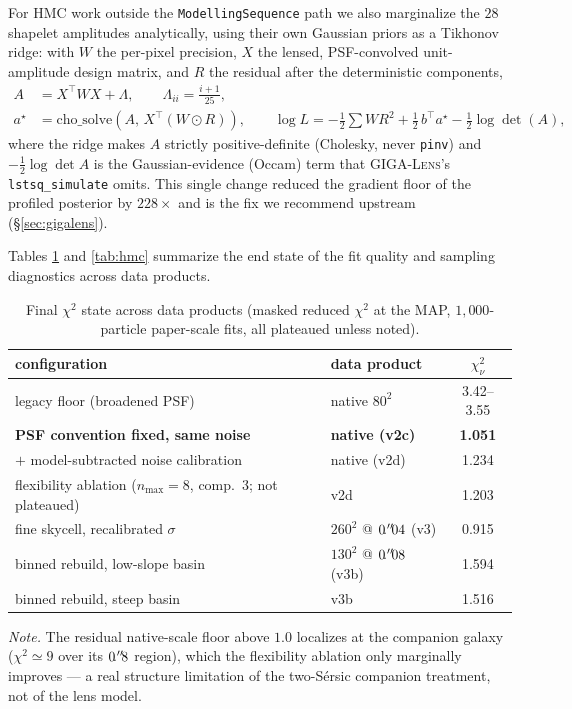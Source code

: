 \documentclass[11pt,letterpaper]{article}
\newcommand{\gigalens}{\textsc{GIGA-Lens}}
\begin{document}
For HMC work outside the \texttt{ModellingSequence} path we also
marginalize the $28$ shapelet amplitudes analytically, using their own
Gaussian priors as a Tikhonov ridge: with $W$ the per-pixel precision,
$X$ the lensed, PSF-convolved unit-amplitude design matrix, and $R$ the
residual after the deterministic components,
\begin{align*}
  A &= X^{\!\top} W X + \Lambda, \qquad
       \Lambda_{ii} = \frac{i+1}{25},\\
  a^{\star} &= \mathrm{cho\_solve}(A,\,X^{\!\top}(W\!\odot R)),\qquad
  \log L = -\tfrac12\!\sum W R^{2}
            + \tfrac12\, b^{\!\top} a^{\star}
            - \tfrac12 \log\det(A),
\end{align*}
where the ridge makes $A$ strictly positive-definite (Cholesky, never
\texttt{pinv}) and $-\tfrac12\log\det A$ is the Gaussian-evidence
(Occam) term that \gigalens's \texttt{lstsq\_simulate} omits. This
single change reduced the gradient floor of the profiled posterior by
$228\times$ and is the fix we recommend upstream
(\S\ref{sec:gigalens}).

Tables \ref{tab:ladder} and \ref{tab:hmc} summarize the end state of
the fit quality and sampling diagnostics across data products.

\begin{table}[ht]
\centering
\caption{Final $\chi^{2}$ state across data products (masked reduced
$\chi^{2}$ at the MAP, $1{,}000$-particle paper-scale fits, all
plateaued unless noted).}
\label{tab:ladder}
\begin{tabular}{llc}
\toprule
configuration & data product & $\chi^{2}_{\nu}$ \\
\midrule
legacy floor (broadened PSF) & native $80^2$ & 3.42--3.55 \\
{\bf PSF convention fixed, same noise} & {\bf native (v2c)} & {\bf 1.051} \\
$+$ model-subtracted noise calibration & native (v2d) & 1.234 \\
flexibility ablation ($n_{\max}{=}8$, comp.~3; not plateaued) & v2d & 1.203 \\
fine skycell, recalibrated $\sigma$ & $260^2$ @ $0\mbox{$\!\!\,.{}^{\prime\prime}\!\!\,$}04$ (v3) & 0.915 \\
binned rebuild, low-slope basin & $130^2$ @ $0\mbox{$\!\!\,.{}^{\prime\prime}\!\!\,$}08$ (v3b) & 1.594 \\
binned rebuild, steep basin & v3b & 1.516 \\
\bottomrule
\end{tabular}
\par\smallskip
{\footnotesize\textit{Note.} The residual native-scale floor above
$1.0$ localizes at the companion galaxy ($\chi^{2}\simeq9$ over its
$0\mbox{$\!\!\,.{}^{\prime\prime}\!\!\,$}8$ region), which the flexibility ablation only marginally
improves --- a real structure limitation of the two-S\'{e}rsic
companion treatment, not of the lens model.}
\end{table}
\end{document}
